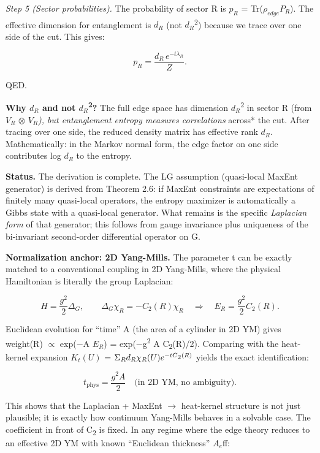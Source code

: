 \documentclass[11pt,a4paper]{article}
\theoremstyle{remark}
\begin{document}
\emph{Step 5 (Sector probabilities).} The probability of sector R is
\(p_R\) = Tr(\(\ensuremath{\rho}_{edge} P_R\)). The effective dimension for
entanglement is \(d_R\) (not \(d_R\)\textsuperscript{2}) because we trace over one side of the
cut. This gives:

\[
p_R = \frac{d_R \, e^{-t \lambda_R}}{Z}.
\]

QED.

\textbf{Why \(d_R\) and not \(d_R\)\textsuperscript{2}?} The full edge space has dimension \(d_R\)\textsuperscript{2} in
sector R (from \(V_R\) \ensuremath{\otimes} \(V_R\)\emph{), but entanglement entropy measures
correlations }across* the cut. After tracing over one side, the reduced density
matrix has effective rank \(d_R\). Mathematically: in the Markov normal form, the
edge factor on one side contributes log \(d_R\) to the entropy.

\textbf{Status.} The derivation is complete. The LG assumption (quasi-local MaxEnt
generator) is derived from Theorem 2.6: if MaxEnt constraints are expectations
of finitely many quasi-local operators, the entropy maximizer is automatically
a Gibbs state with a quasi-local generator. What remains is the specific
\emph{Laplacian form} of that generator; this follows from gauge invariance plus
uniqueness of the bi-invariant second-order differential operator on G.

\textbf{Normalization anchor: 2D Yang-Mills.} The parameter t can be exactly
matched to a conventional coupling in 2D Yang-Mills, where the physical
Hamiltonian is literally the group Laplacian:

\[
H = \frac{g^2}{2} \Delta_G, \qquad
\Delta_G \chi_R = -C_2(R) \chi_R
\quad \Rightarrow \quad
E_R = \frac{g^2}{2} C_2(R).
\]

Euclidean evolution for ``time'' A (the area of a cylinder in 2D YM) gives
weight(R) \ensuremath{\propto} exp(\ensuremath{-}A \(E_R\)) = exp(\ensuremath{-}g\textsuperscript{2} A C\textsubscript{2}(R)/2). Comparing with the
heat-kernel expansion \(K_t(U)\) = \(\ensuremath{\Sigma}_R d_R \ensuremath{\chi}_R(U) e^{\ensuremath{-}t C\textsubscript{2}(R)}\) yields the
exact identification:

\[
t_\mathrm{phys} = \frac{g^2 A}{2} \quad \text{(in 2D YM, no ambiguity).}
\]

This shows that the Laplacian + MaxEnt \ensuremath{\to} heat-kernel structure is not just
plausible; it is exactly how continuum Yang-Mills behaves in a solvable case.
The coefficient in front of C\textsubscript{2} is fixed. In any regime where the edge theory
reduces to an effective 2D YM with known ``Euclidean thickness'' \(A_e\)ff:
\end{document}
